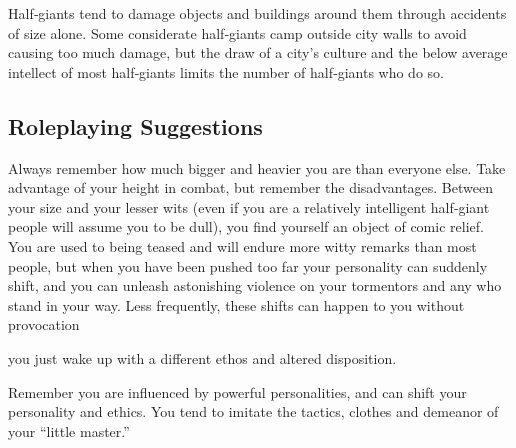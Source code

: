 \documentclass[10pt,a4paper,twocolumn]{d20}
\begin{document}
Half‐giants tend to damage objects and buildings around them through accidents of size alone. Some considerate half‐giants camp outside city walls to avoid causing too much damage, but the draw of a city’s culture and the below average intellect of most half‐giants limits the number of half‐giants who do so.

\subsection{Roleplaying Suggestions}
Always remember how much bigger and heavier you are than everyone else. Take advantage of your height in combat, but remember the disadvantages. Between your size and your lesser wits (even if you are a relatively intelligent half‐giant people will assume you to be dull), you find yourself an object of comic relief. You are used to being teased and will endure more witty remarks than most people, but when you have been pushed too far your personality can suddenly shift, and you can unleash astonishing violence on your tormentors and any who stand in your way. Less frequently, these shifts can happen to you without provocation {you just wake up with a different ethos and altered disposition.

Remember you are influenced by powerful personalities, and can shift your personality and ethics. You tend to imitate the tactics, clothes and demeanor of your ``little master.''
}
\end{document}
